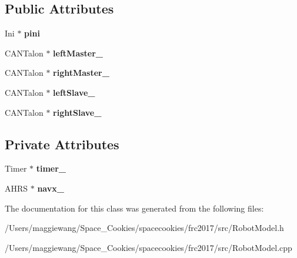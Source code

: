 \subsection*{Public Attributes}
\begin{DoxyCompactItemize}
\item 
\mbox{\label{class_robot_model_ab717f68553a5a87e822104526c2c384e}} 
Ini $\ast$ {\bfseries pini}
\item 
\mbox{\label{class_robot_model_a4b24c35077efb8134a6c8c39dbec0a94}} 
C\+A\+N\+Talon $\ast$ {\bfseries left\+Master\+\_\+}
\item 
\mbox{\label{class_robot_model_a2dba54867affd957c357da252767cb12}} 
C\+A\+N\+Talon $\ast$ {\bfseries right\+Master\+\_\+}
\item 
\mbox{\label{class_robot_model_ab8412b3ded9c56ff0dc064c6bd717236}} 
C\+A\+N\+Talon $\ast$ {\bfseries left\+Slave\+\_\+}
\item 
\mbox{\label{class_robot_model_abfeab5e7111c28a26b070e811c1a5fd2}} 
C\+A\+N\+Talon $\ast$ {\bfseries right\+Slave\+\_\+}
\end{DoxyCompactItemize}
\subsection*{Private Attributes}
\begin{DoxyCompactItemize}
\item 
\mbox{\label{class_robot_model_a31809e8f8fddca2bf39ed07a2a6e9450}} 
Timer $\ast$ {\bfseries timer\+\_\+}
\item 
\mbox{\label{class_robot_model_a06263c46912cfbab7480fe2395b63533}} 
A\+H\+RS $\ast$ {\bfseries navx\+\_\+}
\end{DoxyCompactItemize}


The documentation for this class was generated from the following files\+:\begin{DoxyCompactItemize}
\item 
/\+Users/maggiewang/\+Space\+\_\+\+Cookies/spacecookies/frc2017/src/Robot\+Model.\+h\item 
/\+Users/maggiewang/\+Space\+\_\+\+Cookies/spacecookies/frc2017/src/Robot\+Model.\+cpp\end{DoxyCompactItemize}
